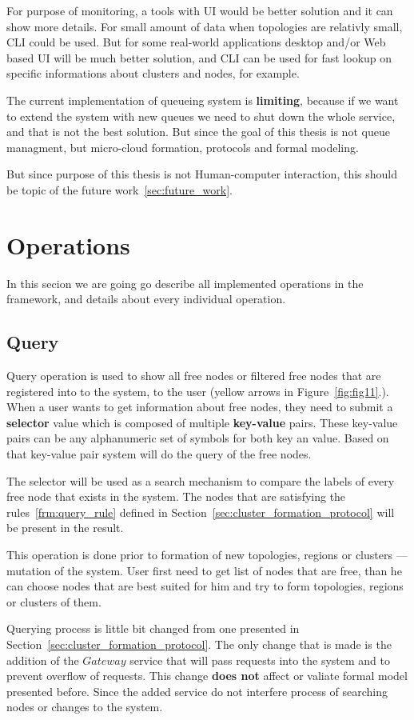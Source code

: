 For purpose of monitoring, a tools with UI would be better solution and it can show more details. For small amount of data when topologies are relativly small, CLI could be used. But for some real-world applications desktop and/or Web based UI will be much better solution, and CLI can be used for fast lookup on specific informations about clusters and nodes, for example.

The current implementation of queueing system is \textbf{limiting}, because if we want to extend the system with new queues we need to shut down the whole service, and that is not the best solution. But since the goal of this thesis is not queue managment, but micro-cloud formation, protocols and formal modeling.

But since purpose of this thesis is not Human-computer interaction, this should be topic of the future work~\ref{sec:future_work}.
%
%
\section{Operations}\label{sec:framework_operations}
%
In this secion we are going go describe all implemented operations in the framework, and details about every individual operation.
%
%
\subsection{Query}\label{sec:query} 
% 
Query operation is used to show all free nodes or filtered free nodes that are registered into to the system, to the user (yellow arrows in Figure~\ref{fig:fig11}.). When a user wants to get information about free nodes, they need to submit a \textbf{selector} value which is composed of multiple \textbf{key-value} pairs.  These key-value pairs can be any alphanumeric set of symbols for both key an value. Based on that key-value pair system will do the query of the free nodes.

The selector will be used as a search mechanism to compare the labels of every free node that exists in the system. The nodes that are satisfying the rules~\ref{frm:query_rule} defined in Section~\ref{sec:cluster_formation_protocol} will be present in the result.

This operation is done prior to formation of new topologies, regions or clusters --- mutation of the system. User first need to get list of nodes that are free, than he can choose nodes that are best suited for him and try to form topologies, regions or clusters of them.

Querying process is little bit changed from one presented in Section~\ref{sec:cluster_formation_protocol}. The only change that is made is the addition of the $Gateway$ service that will pass requests into the system and to prevent overflow of requests. This change \textbf{does not} affect or valiate formal model presented before. Since the added service do not interfere process of searching nodes or changes to the system.


